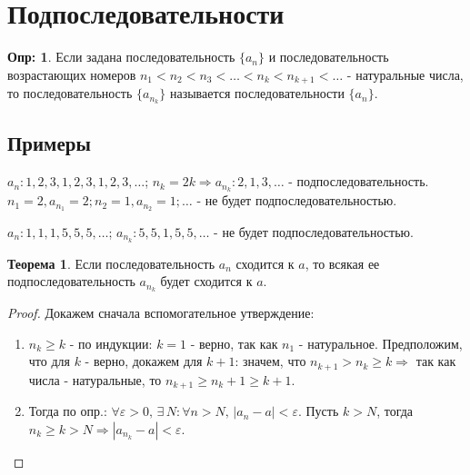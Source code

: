 \documentclass[12pt]{article}
\theoremstyle{definition}
\newtheorem{defn}{Опр:}
\newtheorem{theorem}{Теорема}
\begin{document}

\section*{Подпоследовательности}

\begin{defn}
	Если задана последовательность $\{a_n\}$ и последовательность возрастающих номеров $n_1 < n_2 < n_3 < \dotsc < n_k < n_{k+1} < \dotsc$ - натуральные числа, то последовательность $\{a_{n_k}\}$ называется  последовательности $\{a_n\}$.
\end{defn}

\subsection*{Примеры}

$a_n \colon 1, 2, 3, 1, 2, 3, 1, 2, 3, \dotsc$; $n_k = 2k \Rightarrow a_{n_k} \colon 2, 1, 3, \dotsc$ - подпоследовательность.\\ 
$n_1 = 2, a_{n_1} = 2; n_2 = 1, a_{n_2} = 1; \dotsc$ - не будет подпоследовательностью. 


$a_n \colon 1, 1, 1, 5, 5, 5, \dotsc$; $a_{n_k} \colon 5, 5, 1, 5, 5, \dotsc$ - не будет подпоследовательностью.

\begin{theorem}
	Если последовательность $a_n$ сходится к $a$, то всякая ее подпоследовательность $a_{n_k}$ будет сходится к $a$.
\end{theorem}
\begin{proof} Докажем сначала вспомогательное утверждение:
	\begin{enumerate}[label={(\arabic*)}]
		\item $n_k \geq k$ - по индукции: $k = 1$ - верно, так как $n_1$ - натуральное. Предположим, что для $k$ - верно, докажем для $k+1$: значем, что $n_{k+1} > n_k \geq k \Rightarrow$ так как числа - натуральные, то $n_{k+1} \geq n_k + 1 \geq k + 1$.
		\item Тогда по опр.: $\forall \varepsilon > 0,\, \exists \, N \colon \forall n > N,\, |a_n - a| < \varepsilon$. Пусть $k > N$, тогда $n_k \geq k > N \Rightarrow |a_{n_k}\! - a| < \varepsilon$.
	\end{enumerate}
\end{proof}
\end{document}
